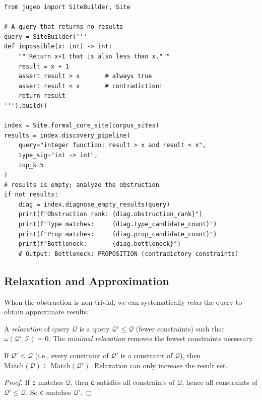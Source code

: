 \documentclass[11pt]{article}
\newcommand{\SemIndex}{\mathcal{I}}
\newcommand{\QuerySheaf}{\mathcal{Q}}
\newcommand{\ObstructionClass}{\omega}               %
\begin{document}
\begin{lstlisting}[style=jugeo-python]
from jugeo import SiteBuilder, Site

# A query that returns no results
query = SiteBuilder('''
def impossible(x: int) -> int:
    """Return x+1 that is also less than x."""
    result = x + 1
    assert result > x       # always true
    assert result < x       # contradiction!
    return result
''').build()

index = Site.formal_core_site(corpus_sites)
results = index.discovery_pipeline(
    query="integer function: result > x and result < x",
    type_sig="int -> int",
    top_k=5
)
# results is empty; analyze the obstruction
if not results:
    diag = index.diagnose_empty_results(query)
    print(f"Obstruction rank: {diag.obstruction_rank}")
    print(f"Type matches:     {diag.type_candidate_count}")
    print(f"Prop matches:     {diag.prop_candidate_count}")
    print(f"Bottleneck:       {diag.bottleneck}")
    # Output: Bottleneck: PROPOSITION (contradictory constraints)
\end{lstlisting}

\subsection{Relaxation and Approximation}

When the obstruction is non-trivial, we can systematically \emph{relax}
the query to obtain approximate results.

\begin{definition}\label{def:query-relaxation}
A \emph{relaxation} of query $\QuerySheaf$ is a query
$\QuerySheaf' \leq \QuerySheaf$ (fewer constraints) such that
$\ObstructionClass(\QuerySheaf', \SemIndex) = 0$.  The \emph{minimal
relaxation} removes the fewest constraints necessary.
\end{definition}

\begin{lemma}\label{lem:relax-mono}
If $\QuerySheaf' \leq \QuerySheaf$ (i.e., every constraint of
$\QuerySheaf'$ is a constraint of $\QuerySheaf$), then
$\mathrm{Match}(\QuerySheaf) \subseteq \mathrm{Match}(\QuerySheaf')$.
Relaxation can only increase the result set.
\end{lemma}

\begin{proof}
If $\mathsf{c}$ matches $\QuerySheaf$, then $\mathsf{c}$ satisfies all
constraints of $\QuerySheaf$, hence all constraints of $\QuerySheaf'
\leq \QuerySheaf$.  So $\mathsf{c}$ matches $\QuerySheaf'$.
\end{proof}
\end{document}
